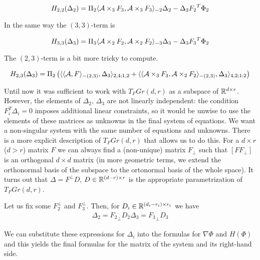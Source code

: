 \begin{equation}
H_{2,2}(\Delta{_2}) = \Pi{_2} \langle \mathcal{A} \times_3 {F_3}, \mathcal{A} \times_3 {F_3} \rangle_{-2} \Delta{_2} - \Delta{_2} {F_2}^T \Phi{_2}
\end{equation}

In the same way the $(3,3)$-term is

\begin{equation}
{H}_{3,3}(\Delta{_3}) = \Pi{_3} \langle \mathcal{A} \times_2 {F_2}, \mathcal{A} \times_2 {F_2} \rangle_{-3} \Delta{_3} - \Delta{_3} {F_3}^T \Phi{_2}
\end{equation}

The $(2,3)$-term is a bit more tricky to compute.

\begin{equation}
H_{2,3}(\Delta{_3}) = \Pi{_2} \left( \langle  \langle \mathcal{A}, F \rangle_{-(2,3)}, \Delta{_3} \rangle_{2,4;1,2}    
+ \langle \langle \mathcal{A} \times_3 {F_3}, \mathcal{A} \times_2 {F_2} \rangle_{-(2,3)}, \Delta{_3} \rangle_{4,2;1:2} \right)
\end{equation}

Until now it was sufficient to work with $T_F Gr(d,r)$ as a subspace of  $\mathbb{R}^{d \times r}$.
However, the elements of $\Delta_2$, $\Delta_3$ are not linearly independent:
the condition $F_i^T \Delta_i = 0$ imposes additional linear constraints,
so it would be unwise to use the elements of these matrices as unknowns
in the final system of equations. We want a non-singular system
with the same number of equations and unknowns. There is a more explicit description
of $T_F Gr(d, r)$ that allows us to do this.  For a $d \times r$ ($d > r$) matrix
$F$ we can always find a (non-unique) matrix $F_{\bot}$ such that $[ F F_{\bot} ]$
is an orthogonal $d \times d$ matrix (in more geometric terms, we extend the orthonormal
basis of the subspace to the ortonormal basis of the whole space). It turns out that
$\Delta = F^{\bot} D$, $D \in \mathbb{R}^{(d-r) \times r}$ is the appropriate parametrization
of $T_F Gr(d, r)$.

Let us fix some
$F_{2}^{\bot}$ and $F_3^{\bot}$. Then, for $D_i \in \mathbb{R}^{(d_i - r_i) \times r_i}$
we have
\begin{eqnarray}
\Delta{_2} = {F_2}_{\bot} D{_2}
\Delta{_3} = {F_3}_{\bot} D{_3}
\end{eqnarray}

We can substitute these expressions
for $\Delta_i$ into the formulas for $\nabla \Phi$ and $H(\Phi)$
and this yields the final formulas for the matrix of the system
and its right-hand side.


